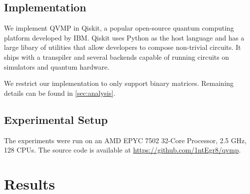 \documentclass[11pt]{article}
\theoremstyle{definition}
\theoremstyle{remark}
\begin{document}
\subsection{Implementation}

We implement QVMP in Qiskit, a popular open-source quantum computing platform developed by IBM.
Qiskit uses Python as the host language and has a large libary of utilities that allow
developers to compose non-trivial circuits. It ships with a transpiler and
several backends capable of running circuits on simulators and quantum hardware.

We restrict our implementation to only support binary matrices. Remaining
details can be found in \cref{sec:analysis}.

\subsection{Experimental Setup}

The experiments were run on an AMD EPYC 7502 32-Core Processor, 2.5 GHz, 128
CPUs. The source code is available at \url{https://github.com/1ntEgr8/qvmp}.

\section{Results}

\end{document}

